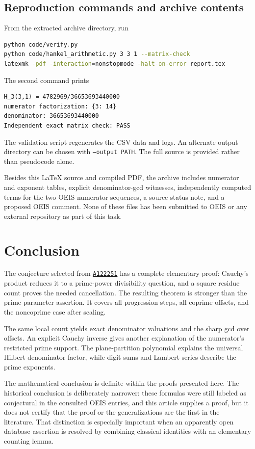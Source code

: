 \documentclass[11pt,a4paper]{article}
\numberwithin{equation}{section}
\theoremstyle{definition}
\theoremstyle{remark}
\newcommand{\OEIS}[1]{\href{https://oeis.org/#1}{\texttt{#1}}}
\begin{document}
\subsection{Reproduction commands and archive contents}
From the extracted archive directory, run
\begin{lstlisting}[language=bash]
python code/verify.py
python code/hankel_arithmetic.py 3 3 1 --matrix-check
latexmk -pdf -interaction=nonstopmode -halt-on-error report.tex
\end{lstlisting}
The second command prints
\begin{lstlisting}[language={}]
H_3(3,1) = 4782969/36653693440000
numerator factorization: {3: 14}
denominator: 36653693440000
Independent exact matrix check: PASS
\end{lstlisting}
The validation script regenerates the CSV data and logs. An alternate output directory can be chosen with \texttt{--output PATH}. The full source is provided rather than pseudocode alone.

Besides this \LaTeX{} source and compiled PDF, the archive includes numerator and exponent tables, explicit denominator-gcd witnesses, independently computed terms for the two OEIS numerator sequences, a source-status note, and a proposed OEIS comment. None of these files has been submitted to OEIS or any external repository as part of this task.

\section{Conclusion}\label{sec:conclusion}
The conjecture selected from \OEIS{A122251} has a complete elementary proof: Cauchy's product reduces it to a prime-power divisibility question, and a square residue count proves the needed cancellation. The resulting theorem is stronger than the prime-parameter assertion. It covers all progression steps, all coprime offsets, and the noncoprime case after scaling.

The same local count yields exact denominator valuations and the sharp gcd over offsets. An explicit Cauchy inverse gives another explanation of the numerator's restricted prime support. The plane-partition polynomial explains the universal Hilbert denominator factor, while digit sums and Lambert series describe the prime exponents.

The mathematical conclusion is definite within the proofs presented here. The historical conclusion is deliberately narrower: these formulas were still labeled as conjectural in the consulted OEIS entries, and this article supplies a proof, but it does not certify that the proof or the generalizations are the first in the literature. That distinction is especially important when an apparently open database assertion is resolved by combining classical identities with an elementary counting lemma.
\end{document}
